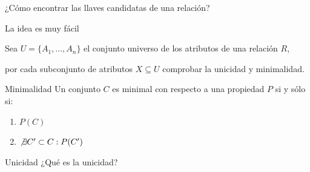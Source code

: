 \begin{frame}
    \centering
    \LARGE \textcolor{blue3}{¿Cómo encontrar las llaves candidatas de una relaci\'on?}
\end{frame}


\begin{frame}{La idea es muy f\'acil}

    Sea $U = \{A_1,...,A_n\}$ el conjunto universo de los atributos de una relaci\'on $R$,

    por cada subconjunto de atributos $X \subseteq U$ comprobar la unicidad y minimalidad.
\end{frame}

\begin{frame}{Minimalidad}
    Un conjunto $C$ es minimal con respecto a una propiedad $P$ si y s\'olo si:\begin{enumerate}
        \item $P(C)$
        \item $\not \exists C' \subset C : P(C')$
    \end{enumerate}
    \vspace{5mm}

    \centering
\end{frame}


\begin{frame}{Unicidad}
    \centering
    \LARGE ¿Qué es la unicidad?
\end{frame}

